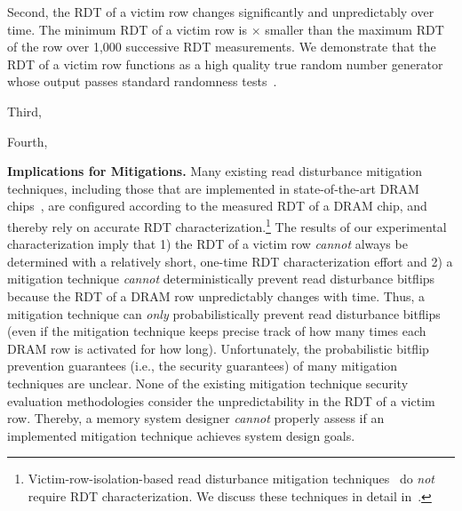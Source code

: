 Second, the RDT of a victim row changes significantly and unpredictably over time. 
The minimum RDT of a victim row is $\times{}$ smaller than the maximum
RDT of the row over 1,000 successive RDT measurements. We demonstrate that the RDT 
of a victim row functions as a high quality true random number generator whose output
passes standard randomness tests~\cite{X}.

Third, 

Fourth, 


\noindent
\textbf{Implications for Mitigations.} Many existing read 
disturbance mitigation techniques, including those that are implemented in state-of-the-art
DRAM chips~\cite{jedecddr5c, bennett2021panopticon, kim2023ddr5, saroiu2024ddr5, 
canpolat2024understanding}, are configured according to the measured RDT of a DRAM chip,
and thereby rely on accurate RDT characterization.\footnote{Victim-row-isolation-based 
read disturbance mitigation techniques~\cite{}
do \emph{not} require RDT characterization. We discuss these techniques in
detail in~.} The results of our experimental characterization 
imply that 1) the RDT of a victim row \emph{cannot} always be determined with a 
relatively short, one-time RDT characterization effort and 2) a mitigation technique
\emph{cannot} deterministically prevent read disturbance bitflips
because the RDT of a DRAM row unpredictably changes with time. Thus, a mitigation technique
can \emph{only} probabilistically prevent read disturbance bitflips (even if the mitigation technique
keeps precise track of how many times each DRAM row is activated for how long). Unfortunately,
the probabilistic bitflip prevention guarantees (i.e., the security guarantees) of many 
mitigation techniques are unclear. None of the existing mitigation technique security 
evaluation methodologies consider the unpredictability in the RDT of a victim row.
Thereby, a memory
system designer \emph{cannot} properly assess if an implemented mitigation technique
achieves system design goals.




